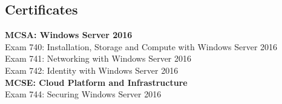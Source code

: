 \documentclass{cv}
\begin{document}
\begin{CJK*}{UTF8}{bsmi}
\section{Certificates}
    \textbf{MCSA: Windows Server 2016}  \\ 
    \hspace*{0.4cm}Exam 740: Installation, Storage and Compute with Windows Server 2016 \\
    \hspace*{0.4cm}Exam 741: Networking with Windows Server 2016 \\
    \hspace*{0.4cm}Exam 742: Identity with Windows Server 2016 \\
    \textbf{MCSE: Cloud Platform and Infrastructure}  \\ 
    \hspace*{0.4cm}Exam 744: Securing Windows Server 2016 \\
\end{CJK*}
\end{document}
